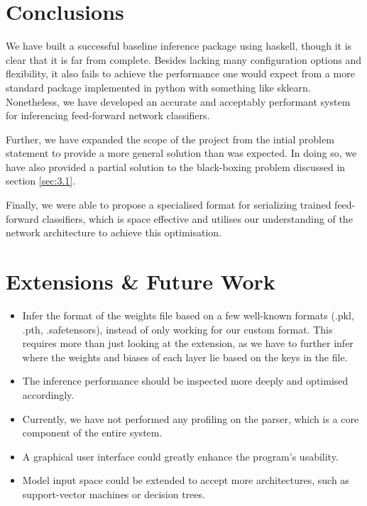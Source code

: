 \documentclass[12pt, titlepage]{article}
\begin{document}
\section{Conclusions}
We have built a successful baseline inference package using haskell, though it is clear that it is far from complete. Besides lacking many configuration options and flexibility, it also fails to achieve the performance one would expect from a more standard package implemented in python with something like sklearn. Nonetheless, we have developed an accurate and acceptably performant system for inferencing feed-forward network classifiers.\bigskip

Further, we have expanded the scope of the project from the intial problem statement to provide a more general solution than was expected. In doing so, we have also provided a partial solution to the black-boxing problem discussed in section \ref{sec:3.1}.\bigskip

Finally, we were able to propose a specialised format for serializing trained feed-forward classifiers, which is space effective and utilises our understanding of the network architecture to achieve this optimisation.

\section{Extensions \& Future Work}
\begin{itemize}
	\item Infer the format of the weights file based on a few well-known formats (.pkl, .pth, .safetensors), instead of only working for our custom format. This requires more than just looking at the extension, as we have to further infer where the weights and biases of each layer lie based on the keys in the file. 
	\item The inference performance should be inspected more deeply and optimised accordingly.
	\item Currently, we have not performed any profiling on the parser, which is a core component of the entire system.
	\item A graphical user interface could greatly enhance the program's usability.
	\item Model input space could be extended to accept more architectures, such as support-vector machines or decision trees.
\end{itemize}
\end{document}
